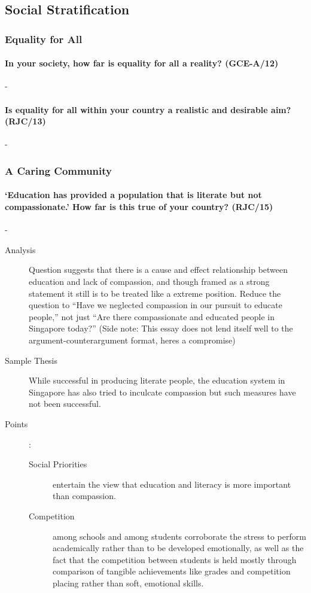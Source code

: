 \documentclass[../../main]{subfiles}
\begin{document}
\subsection{Social Stratification}

\subsubsection{Equality for All}

\paragraph{In your society, how far is equality for all a reality? (GCE-A/12)}-

\paragraph{Is equality for all within your country a realistic and desirable aim? (RJC/13)}-

\subsubsection{A Caring Community}

\paragraph{`Education has provided a population that is literate but not compassionate.' How far is this true of your country? (RJC/15)}-

\begin{description}
	\item[Analysis] Question suggests that there is a cause and effect relationship between education and lack of compassion, and though framed as a strong statement it still is to be treated like a extreme position. Reduce the question to ``Have we neglected compassion in our pursuit to educate people,'' not just ``Are there compassionate and educated people in Singapore today?'' (Side note: This essay does not lend itself well to the argument-counterargument format, heres a compromise)
	\item[Sample Thesis] While successful in producing literate people, the education system in Singapore has also tried to inculcate compassion but such measures have not been successful.
	\item[Points]:
		\begin{description}
			\item[Social Priorities] entertain the view that education and literacy is more important than compassion.
			\item[Competition] among schools and among students corroborate the stress to perform academically rather than to be developed emotionally, as well as the fact that the competition between students is held mostly through comparison of tangible achievements like grades and competition placing rather than soft, emotional skills.
		\end{description}
\end{description}
\end{document}
